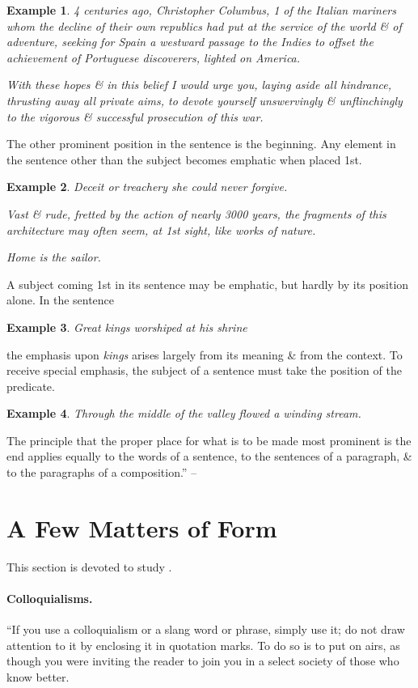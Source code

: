 \documentclass[oneside]{book}
\numberwithin{equation}{section}
\newtheorem{example}{Example}[chapter]
\begin{document}
\begin{example}
	4 centuries ago, Christopher Columbus, 1 of the Italian mariners whom the decline of their own republics had put at the service of the world \& of adventure, seeking for Spain a westward passage to the Indies to offset the achievement of Portuguese discoverers, lighted on America.
	
	With these hopes \& in this belief I would urge you, laying aside all hindrance, thrusting away all private aims, to devote yourself unswervingly \& unflinchingly to the vigorous \& successful prosecution of this war.
\end{example}
The other prominent position in the sentence is the beginning. Any element in the sentence other than the subject becomes emphatic when placed 1st.

\begin{example}
	Deceit or treachery she could never forgive.
	
	Vast \& rude, fretted by the action of nearly 3000 years, the fragments of this architecture may often seem, at 1st sight, like works of nature.
	
	Home is the sailor.
\end{example}
A subject coming 1st in its sentence may be emphatic, but hardly by its position alone. In the sentence

\begin{example}
	Great kings worshiped at his shrine
\end{example}
the emphasis upon \textit{kings} arises largely from its meaning \& from the context. To receive special emphasis, the subject of a sentence must take the position of the predicate.

\begin{example}
	Through the middle of the valley flowed a winding stream.
\end{example}
The principle that the proper place for what is to be made most prominent is the end applies equally to the words of a sentence, to the sentences of a paragraph, \& to the paragraphs of a composition.'' -- \cite[Chap. 2, Sect. 22, pp. 48--49]{Strunk_White2019}

\section{A Few Matters of Form}
This section is devoted to study \cite[Chap. 3]{Strunk_White2019}.

\paragraph*{Colloquialisms.} ``If you use a colloquialism or a slang word or phrase, simply use it; do not draw attention to it by enclosing it in quotation marks. To do so is to put on airs, as though you were inviting the reader to join you in a select society of those who know better.
\end{document}

